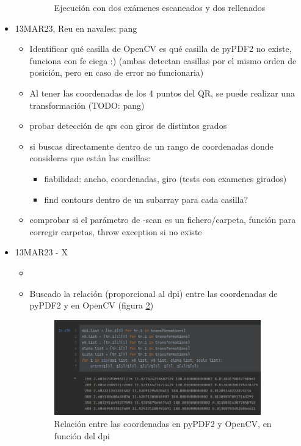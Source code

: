 \begin{itemize}
\begin{itemize}
\begin{figure}
                \caption{Ejecución con dos exámenes escaneados y dos rellenados}
                \label{fig:run_2scan_2filled}
        \end{figure}
    \end{itemize}
    \item 13MAR23, Reu en navales: pang
    \begin{itemize}
        \item Identificar qué casilla de OpenCV es qué casilla de pyPDF2 no existe, funciona con fe ciega :) (ambas detectan casillas por el mismo orden de posición, pero en caso de error no funcionaria)
        \item Al tener las coordenadas de los 4 puntos del QR, se puede realizar una transformación (TODO: pang)
        \item probar detección de qrs con  giros de distintos grados
        \item si buscas directamente dentro de un rango de coordenadas donde consideras que están las casillas:
        \begin{itemize}
            \item fiabilidad: ancho, coordenadas, giro (tests con examenes girados)
            \item find contours dentro de un subarray para cada casilla?
        \end{itemize}
        \item comprobar si el parámetro de -scan es un fichero/carpeta, función para corregir carpetas, throw exception si no existe
    \end{itemize}
    \item 13MAR23 - X
    \begin{itemize}
        \item 
        \item Buscado la relación (proporcional al dpi) entre las coordenadas de pyPDF2 y en OpenCV (figura \ref{fig:dpi_transformation})
        \begin{figure}
                \centering
                \includegraphics[width=0.9\textwidth]{figures/dpi_transformation.jpeg}
                \caption{Relación entre las coordenadas en pyPDF2 y OpenCV, en función del dpi}
                \label{fig:dpi_transformation}
        \end{figure}
    \end{itemize}
\end{itemize}